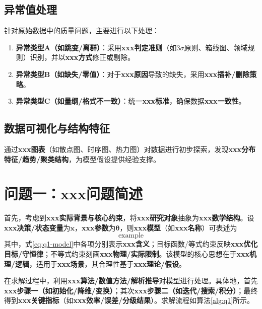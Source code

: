 \documentclass[draft,12pt,a4paper]{ctexart}
\theoremstyle{definition}
\begin{document}
\subsection{异常值处理}
针对原始数据中的质量问题，主要进行以下处理：
\begin{enumerate}[label=\arabic*.]
  \item \textbf{异常类型A（如跳变/离群）}：采用\textbf{xxx判定准则}（如3$\sigma$原则、箱线图、领域规则）识别，并以\textbf{xxx方式}修正或剔除。
  \item \textbf{异常类型B（如缺失/零值）}：对于\textbf{xxx原因}导致的缺失，采用\textbf{xxx插补/删除策略}。
  \item \textbf{异常类型C（如量纲/格式不一致）}：统一\textbf{xxx标准}，确保数据\textbf{xxx一致性}。
\end{enumerate}

\subsection{数据可视化与结构特征}
通过\textbf{xxx图表}（如散点图、时序图、热力图）对数据进行初步探索，发现\textbf{xxx分布特征/趋势/聚类结构}，为模型假设提供经验支撑。

\newpage

\section{问题一：\textbf{xxx问题简述}}

首先，考虑到\textbf{xxx实际背景与核心约束}，将\textbf{xxx研究对象}抽象为\textbf{xxx数学结构}。设\textbf{xxx决策/状态变量}为$\boldsymbol{x}$，\textbf{xxx参数}为$\boldsymbol{\theta}$，则\textbf{xxx模型}（如\textbf{xxx名称}）可表述为
\begin{equation}\label{eq:q1-model}
  \text{example}
\end{equation}
其中，式\eqref{eq:q1-model}中各项分别表示\textbf{xxx含义}；目标函数/等式约束反映\textbf{xxx优化目标/守恒律}；不等式约束刻画\textbf{xxx物理/实际限制}。该模型的核心思想在于\textbf{xxx机理/逻辑}，适用于\textbf{xxx场景}，其合理性基于\textbf{xxx理论/假设}。

在求解过程中，利用\textbf{xxx算法/数值方法/解析推导}对模型进行处理。具体地，首先\textbf{xxx步骤一（如初始化/降维/变换）}；其次\textbf{xxx步骤二（如迭代/搜索/积分）}；最终得到\textbf{xxx关键指标}（如\textbf{xxx效率/误差/分级结果}）。求解流程如算法\ref{alg:q1}所示。
\end{document}
